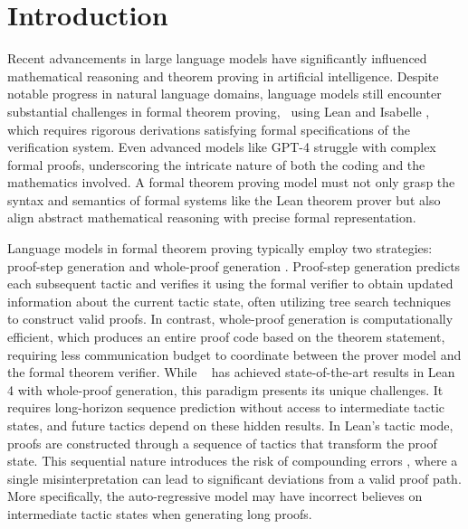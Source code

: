 \section{Introduction}

Recent advancements in large language models have significantly influenced mathematical reasoning and theorem proving in artificial intelligence. Despite notable progress in natural language domains, language models still encounter substantial challenges in formal theorem proving, \eg~using Lean \citep{moura2021lean} and Isabelle \citep{paulson_isabelle_1994}, which requires rigorous derivations satisfying formal specifications of the verification system.
Even advanced models like GPT-4 \citep{OpenAI} struggle with complex formal proofs, underscoring the intricate nature of both the coding and the mathematics involved.
A formal theorem proving model must not only grasp the syntax and semantics of formal systems like the Lean theorem prover but also align abstract mathematical reasoning with precise formal representation.

Language models in formal theorem proving typically employ two strategies: proof-step generation \citep{polu2020generative, jiang2022thor, lample2022hypertree, yang2024leandojo, wu2024lean} and whole-proof generation \citep{jiang2022draft, zhao2023decomposing, wang2023lego}. Proof-step generation predicts each subsequent tactic and verifies it using the formal verifier to obtain updated information about the current tactic state, often utilizing tree search techniques to construct valid proofs. In contrast, whole-proof generation is computationally efficient, which produces an entire proof code based on the theorem statement, requiring less communication budget to coordinate between the prover model and the formal theorem verifier. While \lastwork~\citep{xin2024deepseek} has achieved state-of-the-art results in Lean 4 with whole-proof generation, this paradigm presents its unique challenges. It requires long-horizon sequence prediction without access to intermediate tactic states, and future tactics depend on these hidden results. In Lean's tactic mode, proofs are constructed through a sequence of tactics that transform the proof state. This sequential nature introduces the risk of compounding errors \citep{ross2011reduction}, where a single misinterpretation can lead to significant deviations from a valid proof path. More specifically, the auto-regressive model may have incorrect believes on intermediate tactic states when generating long proofs.


